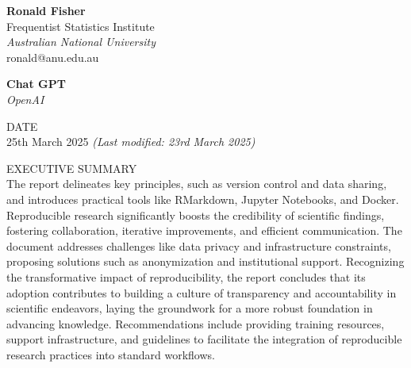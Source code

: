 \documentclass[
  a4paper,
  oneside,
  open=any]{scrbook}
\begin{document}
\begin{frontmatter}
\begin{titlepage}
\begin{minipage}[b][\textheight][s]{\textwidth}
\begin{titlepagebox}
\begin{multicols}{2}
\begin{minipage}{\columnwidth}
      
      \vspace{4mm}
      \end{minipage}

      \begin{minipage}{\columnwidth}
      \raggedright
      \normalfont
      {\textbf{Ronald Fisher}}\\
          {Frequentist Statistics Institute}\\
      {\itshape{Australian National University}}\\
           ronald@anu.edu.au\\
      
      
      \vspace{4mm}
      \end{minipage}

      \begin{minipage}{\columnwidth}
      \raggedright
      \normalfont
      {\textbf{Chat GPT}}\\
          
      {\itshape{OpenAI}}\\
          
      
      
      \vspace{4mm}
      \end{minipage}

  \end{multicols}

  \vspace{-4mm}


  {\textcolor{anugold}{\MakeUppercase{Date}}}\\ 25th March 2025
  {\itshape{(Last modified: 23rd March 2025)}}
  \vspace{3mm}

  \textcolor{anugold}{\MakeUppercase{Executive Summary}}\\
  The report delineates key principles, such as version control and data
  sharing, and introduces practical tools like RMarkdown, Jupyter
  Notebooks, and Docker. Reproducible research significantly boosts the
  credibility of scientific findings, fostering collaboration, iterative
  improvements, and efficient communication. The document addresses
  challenges like data privacy and infrastructure constraints, proposing
  solutions such as anonymization and institutional support. Recognizing
  the transformative impact of reproducibility, the report concludes
  that its adoption contributes to building a culture of transparency
  and accountability in scientific endeavors, laying the groundwork for
  a more robust foundation in advancing knowledge. Recommendations
  include providing training resources, support infrastructure, and
  guidelines to facilitate the integration of reproducible research
  practices into standard workflows.
  \vspace{3mm}


\end{titlepagebox}
\end{minipage}
\end{titlepage}
\end{frontmatter}
\end{document}
